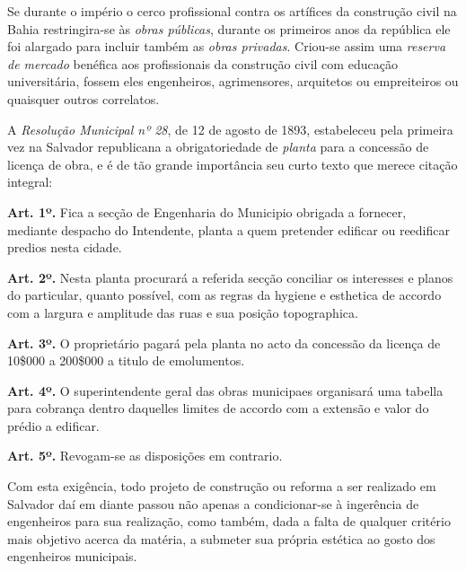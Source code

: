 Se durante o império o cerco profissional contra os artífices da construção civil na Bahia restringira-se às \textit{obras públicas}, durante os primeiros anos da república ele foi alargado para incluir também as \textit{obras privadas}. Criou-se assim uma \textit{reserva de mercado} benéfica aos profissionais da construção civil com educação universitária, fossem eles engenheiros, agrimensores, arquitetos ou empreiteiros ou quaisquer outros correlatos.

A \textit{Resolução Municipal nº 28}, de 12 de agosto de 1893, estabeleceu pela primeira vez na Salvador republicana a obrigatoriedade de \textit{planta} para a concessão de licença de obra, e é de tão grande importância seu curto texto que merece citação integral:

\begin{citacao}
\textbf{Art. 1º.} Fica a secção de Engenharia do Municipio obrigada a fornecer, mediante despacho do Intendente, planta a quem pretender edificar ou reedificar predios nesta cidade.

\textbf{Art. 2º.} Nesta planta procurará a referida secção conciliar os interesses e planos do particular, quanto possível, com as regras da hygiene e esthetica de accordo com a largura e amplitude das ruas e sua posição topographica.

\textbf{Art. 3º.} O proprietário pagará pela planta no acto da concessão da licença de 10\$000 a 200\$000 a titulo de emolumentos.

\textbf{Art. 4º.} O superintendente geral das obras municipaes organisará uma tabella para cobrança dentro daquelles limites de accordo com a extensão e valor do prédio a edificar.

\textbf{Art. 5º.} Revogam-se as disposições em contrario.
\end{citacao}

Com esta exigência, todo projeto de construção ou reforma a ser realizado em Salvador daí em diante passou não apenas a condicionar-se à ingerência de engenheiros para sua realização, como também, dada a falta de qualquer critério mais objetivo acerca da matéria, a submeter sua própria estética ao gosto dos engenheiros municipais.

